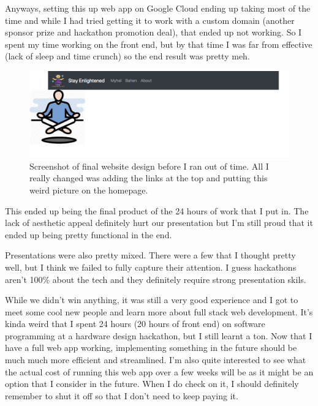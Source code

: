 \documentclass[a4paper,12pt]{gress}
\begin{document}
Anyways, setting this up web app on Google Cloud ending up taking most of the time and while I had tried getting it to work with a custom domain (another sponsor prize and hackathon promotion deal), that ended up not working. So I spent my time working on the front end, but by that time I was far from effective (lack of sleep and time crunch) so the end result was pretty meh.

\begin{figure}[H]
  \begin{center}
  \includegraphics[width=150mm, scale=0.2]{pictures/final-website.png}
  \caption{Screenshot of final website design before I ran out of time. All I really changed was adding the links at the top and putting this weird picture on the homepage.}
  \end{center}
\end{figure}

This ended up being the final product of the 24 hours of work that I put in. The lack of aesthetic appeal definitely hurt our presentation but I'm still proud that it ended up being pretty functional in the end.

Presentations were also pretty mixed. There were a few that I thought pretty well, but I think we failed to fully capture their attention. I guess hackathons aren't 100\% about the tech and they definitely require strong presentation skils.

While we didn't win anything, it was still a very good experience and I got to meet some cool new people and learn more about full stack web development. It's kinda weird that I spent 24 hours (20 hours of front end) on software programming at a hardware design hackathon, but I still learnt a ton. Now that I have a full web app working, implementing something in the future should be much much more efficient and streamlined. I'm also quite interested to see what the actual cost of running this web app over a few weeks will be as it might be an option that I consider in the future. When I do check on it, I should definitely remember to shut it off so that I don't need to keep paying it.


\begin{gress}
\end{gress}
\end{document}
